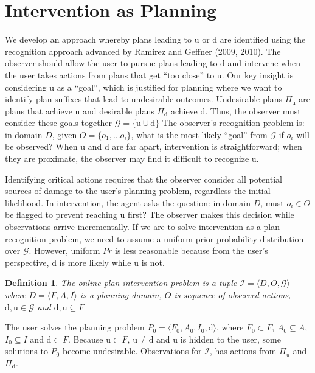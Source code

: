 \documentclass[letterpaper]{article}
\theoremstyle{plain}
\newtheorem{definition}{Definition}
\begin{document}
\section{Intervention as Planning}
\label{sec:intervention}

We develop an approach whereby plans leading to $\mathrm{u}$ or $\mathrm{d}$ are identified using the recognition approach advanced by Ramirez and Geffner (2009, 2010).
The observer should allow the user to pursue plans leading to $\mathrm{d}$ and intervene when the user takes actions from plans that get ``too close'' to $\mathrm{u}$.
Our key insight is considering $\mathrm{u}$ as a ``goal'', which is justified for planning where we want to identify plan suffixes that lead to undesirable outcomes. 
Undesirable plans $\Pi_{\mathrm{u}}$ are plans that achieve $\mathrm{u}$ and desirable plans $\Pi_{\mathrm{d}}$ achieve $\mathrm{d}$. 
Thus, the observer must consider these goals together $\mathcal{G}=\lbrace\mathrm{u} \cup \mathrm{d}\rbrace$
The observer's recognition problem is: in domain $D$, given $O = \lbrace o_1, \ldots o_i\rbrace$, what is the most likely ``goal'' from $\mathcal{G}$ if $o_i$ will be observed? 
When $\mathrm{u}$ and $\mathrm{d}$ are far apart, intervention is straightforward; when they are proximate, the observer may find it difficult to recognize $\mathrm{u}$. 


Identifying critical actions requires that the observer consider all potential sources of damage to the user's planning problem, regardless the initial likelihood.
In intervention, the agent asks the question: in domain $D$, must $o_i \in O$ be flagged to prevent reaching $\mathrm{u}$ first?
The observer makes this decision while observations arrive incrementally. 
If we are to solve intervention as a plan recognition problem, we need to assume a uniform prior probability distribution over $\mathcal{G}$. However, uniform $Pr$ is less reasonable because from the user's perspective, $\mathrm{d}$ is more likely while $\mathrm{u}$ is not. 


\theoremstyle{definition}
\begin{definition}
The \textnormal{online plan intervention problem} is a tuple $\mathcal{I} = \langle D, O, \mathcal{G} \rangle$ where $D=\langle F, A, I \rangle$ is a planning domain, 
$O$ is  sequence of observed actions, $\mathrm{d},\mathrm{u} \in \mathcal{G}$ and 
$\mathrm{d}, \mathrm{u} \subseteq F$
\end{definition}
The user solves the planning problem $P_0=\langle F_0, A_0, I_0,\mathrm{d}\rangle$, where $F_0 \subset F$, $A_0\subseteq A$, $I_0 \subseteq I$ and $\mathrm{d}\subset F$. 
Because $\mathrm{u}\subset F$, $\mathrm{u}\neq \mathrm{d}$ and $\mathrm{u}$ is hidden to the user, some solutions to $P_0$ become undesirable.
Observations for $\mathcal{I}$, has actions from $\Pi_{\mathrm{u}}$ and $\Pi_{\mathrm{d}}$. 
\end{document}
